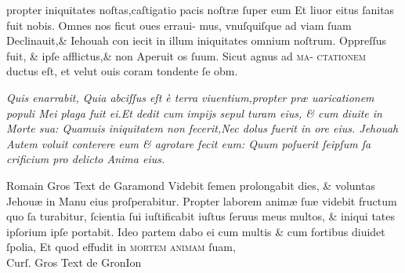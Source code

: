 \documentclass[draft]{article}
\begin{document}
\begin{multicols}{2}
	\noindent propter iniquitates noſtas,caſtigatio pacis noſtr\ae{} ſuper eum\linebreak
	Et liuor eitus ſanitas fuit nobis. Omnes nos ficut oues erraui-\linebreak
	mus, vnuſquiſque ad viam ſuam Declinauit,\& Iehouah con\linebreak
	iecit in illum iniquitates omnium noſtrum. Oppreſſus fuit,\linebreak
	\& ipſe afflictus,\& non Aperuit os ſuum. Sicut agnus ad \textsc{ma}-\linebreak
	\textsc{ctationem} ductus eſt, et velut ouis coram tondente ſe obm.\\

	\columnbreak

	\justifying
	\noindent
	\textit{Quis enarrabit, Quia abciſſus eſt \`e terra viuentium,propter pr\ae{} \linebreak
		uaricationem populi Mei plaga fuit ei.Et dedit cum impijs sepul\linebreak
		turam eius, \& cum diuite in Morte sua: Quamuis iniquitatem\linebreak
		non fecerit,Nec dolus fuerit in ore eius. Jehouah Autem voluit\linebreak
		conterere eum \& agrotare fecit eum: Quum poſuerit ſeipſum ſa\linebreak
		crificium pro delicto Anima eius.}
\end{multicols}
\vspace{-3\baselineskip}
\begin{multicols}{2}
	\tiny
	\centering
	Romain Gros Text de Garamond\linebreak
	\small
	\qquad Videbit ſemen prolongabit dies, \& voluntas Jehou\ae{} in Manu eius\linebreak
	proſperabitur. Propter laborem anim\ae{} ſu\ae{} videbit fructum quo ſa\linebreak
	turabitur, ſcientia ſui iuſtificabit iuſtus ſeruus meus multos, \& iniqui\linebreak
	tates ipſorium ipſe portabit. Ideo partem dabo ei cum multis \& cum\linebreak
	fortibus diuidet ſpolia, Et quod effudit in \textsc{mortem animam} ſuam,\\

	\columnbreak
	\tiny
	\centering
	Curſ. Gros Text de GronIon

	\small
	\justifying
	\noindent
	\textit{}
\end{multicols}
\end{document}
